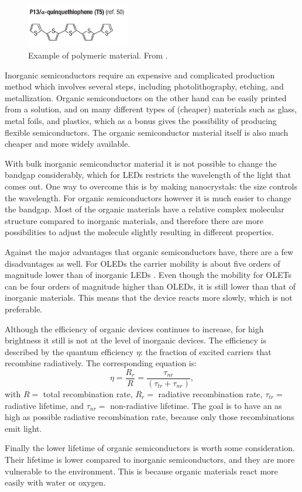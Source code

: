 \begin{figure}[!ht]
 \begin{center}
  \includegraphics[width=0.4\textwidth]{zwavelbenzeen}
  \caption{Example of polymeric material. From \citet{Muccini}.}
  \label{fig:zwavelbenzeen}
 \end{center}
\end{figure}

Inorganic semiconductors require an expensive and complicated production method which involves several steps, including photolithography, etching, and metallization. Organic semiconductors on the other hand can be easily printed from a solution, and on many different types of (cheaper) materials such as glass, metal foils, and plastics, which as a bonus gives the possibility of producing flexible semiconductors. The organic semiconductor material itself is also much cheaper and more widely available.

With bulk inorganic semiconductor material it is not possible to change the bandgap considerably, which for LEDs restricts the wavelength of the light that comes out. One way to overcome this is by making nanocrystals: the size controls the wavelength. For organic semiconductors however it is much easier to change the bandgap. Most of the organic materials have a relative complex molecular structure compared to inorganic materials, and therefore there are more possibilities to adjust the molecule slightly resulting in different properties.

Against the major advantages that organic semiconductors have, there are a few disadvantages as well. For OLEDs the carrier mobility is about five orders of magnitude lower than of inorganic LEDs \citep{Muccini}. Even though the mobility for OLETs can be four orders of magnitude higher than OLEDs, it is still lower than that of inorganic materials. This means that the device reacts more slowly, which is not preferable.

Although the efficiency of organic devices continues to increase, for high brightness it still is not at the level of inorganic devices. The efficiency is described by the quantum efficiency $\eta$: the fraction of excited carriers that recombine radiatively. The corresponding equation is:
\[
 \eta = \frac{R_{r}}{R} = \frac{\tau_{nr}}{(\tau_{tr}+\tau_{nr})},
\]
with $R=$ total recombination rate, $R_{r}=$ radiative recombination rate, $\tau_{tr}=$ radiative lifetime, and $\tau_{nr}=$ non-radiative lifetime. The goal is to have an as high as possible radiative recombination rate, because only those recombinations emit light.

Finally the lower lifetime of organic semiconductors is worth some consideration. Their lifetime is lower compared to inorganic semiconductors, and they are more vulnerable to the environment. This is because organic materials react more easily with water or oxygen. 

